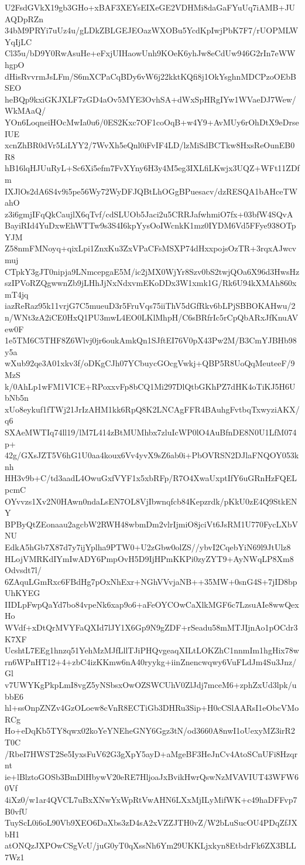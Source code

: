 U2FsdGVkX19gb3GHo+xBAF3XEYsEIXeGE2VDHMi8daGaFYuUq7iAMB+JUAQDpRZn
34bM9PRYi7uUz4u/gLDkZBLGEJEOazWXOBu5YcdKpIwjPbK7F7/rUOPMLWYqIjLC
Cl35u/bD9Y0RwAsuHe+eFxjUIHaowUnh9KOeK6yhJw8eCdUw946G2rIn7eWWhgpO
dHisRvvrmJsLFm/S6mXCPaCqBDy6vW6j22kktKQfi8j1OkYsghnMDCPzoOEbBSEO
heBQp9kxiGKJXLF7zGD4aOv5MYE3OvhSA+dWxSpHRgIYw1WVaeDJ7Wew/WkMAaQ/
YOn6LoqneiHOcMwIa0u6/0ES2Kxc7OF1coOqB+w4Y9+AvMUy6rOhDtX9eDrseIUE
xcnZhBR0dVr5LiLYY2/7WvXh5eQnl0iFvIF4LD/lzMiSdBCTkw8HxsReOunEB0R8
hB16lqHJUuRyL+Sc6Xi5efm7FvXYny6H3y4M5eg3IXLfiLKwjx3UQZ+WFt11ZDfm
IXJlOs2dA6S4v9i5pe56Wy72WyDFJQBtLhOGgBPuesacv/dzRESQA1bAHceTWahO
z3i6gmjIFqQkCaujlX6qTvf/cdSLUOb5Jaci2u5CRRJafwhmiO7fx+03bfW4SQvA
BayiRId4YuDxwEhWTTw9s3S4I6kpYysOoIWcnkK1mz0IYDM6Vd5FFye938OTpYJM
Z58nmFMNoyq+qixLpi1ZnxKu3ZxVPaCFsMSXP74dHxxpojsOzTR+3rqxAJwcvmuj
CTpkY3gJT0nipja9LNmcepgaE5M/ic2jMX0WjYr8Szv0bS2twjQOa6X96d3HwsHz
szIPVoRZQgwwnZb9jLHhJjNxNdxvmEKoDDx3W1xmk1G/Rk6U94kXMAh860xmT4jq
iazReRaz95k11vrjG7C5mueuD3r5FruVqs75iiThV5dGfRkv6bLPjSBBOKAHwu/2
n/WNt3zA2iCE0HxQ1PU3mwL4EO0LKlMhpH/C6sBRfrIc5rCpQbARxJfKnuAVew0F
1e5TM6C5THF8Z6Wlvj0jr6oukAmkQn1SJftEI76V0pX43Pw2M/B3CmYJBHb98y5a
wXub92qe3A01xkv3f/oDKgCJh07YCbuycGOcgVwkj+QBP5R8UoQqMeuteeF/9MzS
k/0AhLp1wFM1VICE+RPoxxvFp8bCQ1Mi297DlQtbGKhPZ7dHK4oTiKJ5H6UbNb5n
xUo8eykuf1fTWj21JrIzAHM1kk6RpQ8K2LNCAgFFR4BAuhgFvtbqTxwyziAKX/q6
SXAeMWTIq74ll19/lM7L414zBtMUMhbx7zluIcWP0lO4AuBfnDE8N0U1LfM074p+
42g/GXsJZT5V6hG1U0aa4koux6Vv4yvX9sZ6ab0i+PbOVRSN2DJlaFNQOY053knh
HH3v9b+C/td3aadL4OwuGxfVYF1x5xbRFp/R7O4XwaUxptIfY6uGRnHzFQELpcmC
OYvvzs1Xv2N0HAwn0ndaLsEN7OL8VjIbwnqfcb84Kepzrdk/pKkU0zE4Q9StkENY
BPByQtZEonaau2agcbW2RWH48wbmDm2vlrIjmiO8jciVt6JsRM1U770FycLXbVNU
EdkA5hGb7X87d7y7ijYplha9PTW0+U2zGbw0olZS//ybvI2CqebYiN69l9JtUlz8
HLojVMRKdIYmIwADY6PmpOvH5D9IjHPmKKPi0zyZYT9+AyNWqLP8Xm8Odvsdt7l/
6ZAquLGmRxc6FBdHg7pOxNhExr+NGhVVvjaNB++35MW+0snG4S+7jID8bpUhKYEG
IIDLpFwpQaYd7bo84vpeNk6xap9o6+aFeOYCOwCaXlkMGF6c7LzsuAIe8wwQexHo
WVdf+xDtQrMVYFaQXId7lJY1X6Gp9N9gZDF+rSeadu58mMTJIjnAo1pOCdr3K7XF
UcshtL7EEg1hnzq51YehMzMJfLllTJiPHQvgeaqXILtLOKZhC1nnmIm1hgHix78w
rn6WPnHT12+4+zbC4izKKmw6nA40ryykg+iinZnencwqwy6VuFLdJm4Su3Jnz/Gl
v7UWYKgPkpLmI8vgZ5yNSbsxOwOZSWCUhV0ZlJdj7mceM6+zphZxUd3lpk/ubbE6
hl+ssOnpZNZv4GzOLoew8cVnR8ECTiGb3DHRu3Sip+H0cCSlAARsI1eObcVMoRCg
Ho+eDqKb5TY8qwx02koYeYNEheGNY6Ggz3tN/od3660A8nwI1oUexyMZ3irR2T0C
/RbeI7HWST2Se5IyxsFuV62G3gXpY5ayD+aMgeBF3HeJnCv4AtoSCnUFi8Hzqrnt
ie+lBlztoGOSb3BmDlHbywV20eRE7HljoaJxBvikHwrQswNzMVAVIUT43WFW60Vf
4iXz0/w1ar4QVCL7uBxXNwYxWpRtVwAHN6LXxMjILyMifWK+c49haDFFvp7B0vfU
TuyScL0i6oL90Vb9XEO6DaXbs3zD4sA2xVZZJTH0vZ/W2bLuSucOU4PDqZfJXbH1
atONQzJXPOwCSgVcU/juG0yT0qXssNh6Ym29UKKLjxkyn8EtbdrFk6ZX3BLL7Wz1
